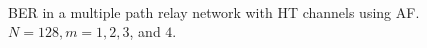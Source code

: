 \begin{figure}
{	 \\
}
\caption{BER in a multiple path relay network with HT channels using AF.  $N = 128, m = 1, 2, 3$, and $4$.}
\label{fig:mp_af_ber_plots_HT}
\end{figure}


